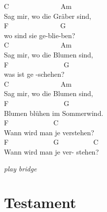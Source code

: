 \documentclass[
  letterpaper,
  a5paper]{memoir}
\begin{document}
C~~~~~~~~~~~~~~~Am~~~~~~~~~~~\\
Sag mir, wo die Gräber sind,\\
F~~~~~~~~~~~~~~~G\\
wo sind sie ge-blie-ben?\\
C~~~~~~~~~~~~~~~Am~~~~~~~~~~~\\
Sag mir, wo die Blumen sind,\\
F~~~~~~~~~~~~~~~~G\\
was ist ge -schehen?\\
C~~~~~~~~~~~~~~~Am~~~~~~~~~~~\\
Sag mir, wo die Blumen sind,\\
F~~~~~~~~~~~~~~~~G\\
Blumen blühen im Sommerwind.\\
F~~~~~~~~~~~~~C~~~~~~~~~~~~~~~~~\\
Wann wird man je verstehen?~~~~~\\
F~~~~~~~~~~~~~G~~~~~~~~~~C\\
Wann wird man je ver- stehen?

\emph{play bridge}

\hypertarget{testament}{%
\chapter{Testament}\label{testament}}
\end{document}
